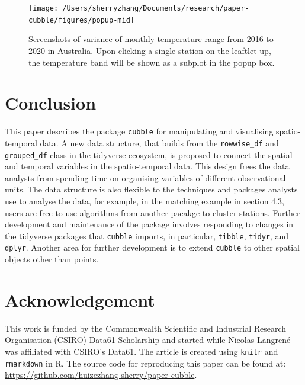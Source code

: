 \documentclass[
]{jss}
\begin{document}
\begin{CodeChunk}
\begin{figure}

{\centering \texttt{[image: /Users/sherryzhang/Documents/research/paper-cubble/figures/popup-mid]} 

}

\caption[Screenshots of variance of monthly temperature range from 2016 to 2020 in Australia]{Screenshots of variance of monthly temperature range from 2016 to 2020 in Australia. Upon clicking a single station on the leaftlet up, the temperature band will be shown as a subplot in the popup box.}\label{fig:interactive-popup}
\end{figure}
\end{CodeChunk}

\hypertarget{conclusion}{%
\section{Conclusion}\label{conclusion}}

This paper describes the  package \texttt{cubble} for
manipulating and visualising spatio-temporal data. A new data structure,
that builds from the \texttt{rowwise\_df} and \texttt{grouped\_df} class
in the tidyverse ecosystem, is proposed to connect the spatial and
temporal variables in the spatio-temporal data. This design frees the
data analysts from spending time on organising variables of different
observational units. The data structure is also flexible to the
techniques and packages analysts use to analyse the data, for example,
in the matching example in section 4.3, users are free to use algorithms
from another pacakge to cluster stations. Further development and
maintenance of the package involves responding to changes in the
tidyverse packages that \texttt{cubble} imports, in particular,
\texttt{tibble}, \texttt{tidyr}, and \texttt{dplyr}. Another area for
further development is to extend \texttt{cubble} to other spatial
objects other than points.

\hypertarget{acknowledgement}{%
\section{Acknowledgement}\label{acknowledgement}}

This work is funded by the Commonwealth Scientific and Industrial
Research Organisation (CSIRO) Data61 Scholarship and started while
Nicolas Langrené was affiliated with CSIRO's Data61. The article is
created using \texttt{knitr} \citep{knitr} and \texttt{rmarkdown}
\citep{rmarkdown} in R. The source code for reproducing this paper can
be found at: \url{https://github.com/huizezhang-sherry/paper-cubble}.
\end{document}
